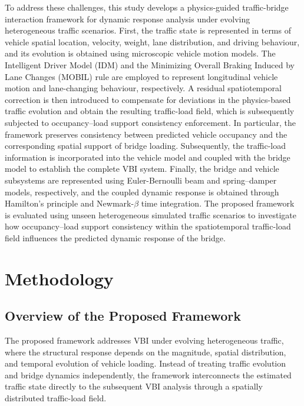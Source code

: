\documentclass[journal]{IEEEtran}
\begin{document}
To address these challenges, this study develops a physics-guided traffic-bridge interaction framework for dynamic response analysis under evolving heterogeneous traffic scenarios. First, the traffic state is represented in terms of vehicle spatial location, velocity, weight, lane distribution, and driving behaviour, and its evolution is obtained using microscopic vehicle motion models. The Intelligent Driver Model (IDM) and the Minimizing Overall Braking Induced by Lane Changes (MOBIL) rule are employed to represent longitudinal vehicle motion and lane-changing behaviour, respectively. A residual spatiotemporal correction is then introduced to compensate for deviations in the physics-based traffic evolution and obtain the resulting traffic-load field, which is subsequently subjected to occupancy–load support consistency enforcement. In particular, the framework preserves consistency between predicted vehicle occupancy and the corresponding spatial support of bridge loading. Subsequently, the traffic-load information is incorporated into the vehicle model and coupled with the bridge model to establish the complete VBI system. Finally, the bridge and vehicle subsystems are represented using Euler-Bernoulli beam and spring--damper models, respectively, and the coupled dynamic response is obtained through Hamilton's principle and Newmark-$\beta$ time integration. The proposed framework is evaluated using unseen heterogeneous simulated traffic scenarios to investigate how occupancy–load support consistency within the spatiotemporal traffic-load field influences the predicted dynamic response of the bridge.

\section{Methodology}
\subsection{Overview of the Proposed Framework}
\label{sec:framework_overview}

The proposed framework addresses VBI under evolving heterogeneous traffic, where the structural response depends on the magnitude, spatial distribution, and temporal evolution of vehicle loading. Instead of treating traffic evolution and bridge dynamics independently, the framework interconnects the estimated traffic state directly to the subsequent VBI analysis through a spatially distributed traffic-load field.
\end{document}
